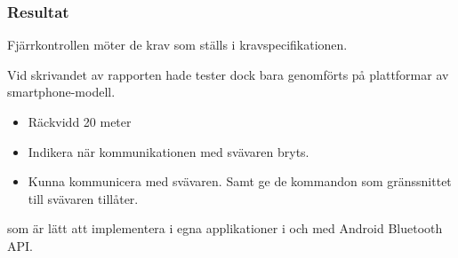 \subsubsection{Resultat}
Fjärrkontrollen möter de krav som ställs i kravspecifikationen.

 Vid skrivandet av rapporten hade tester dock bara
genomförts på plattformar av smartphone-modell.

\begin {itemize}
\item Räckvidd 20 meter
\item Indikera när kommunikationen med svävaren bryts.
\item Kunna kommunicera med svävaren. Samt ge de kommandon som gränssnittet till svävaren tillåter.
\end {itemize}

som är lätt att implementera i egna applikationer i och med
Android Bluetooth API.